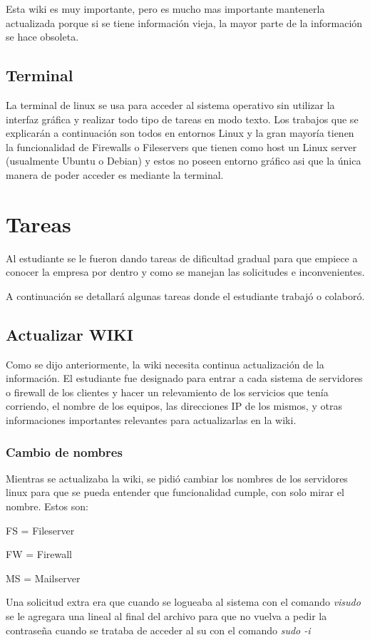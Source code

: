 \documentclass[12pt,a4paper]{article}
\begin{document}
Esta wiki es muy importante, pero es mucho mas importante mantenerla actualizada porque si se tiene información vieja, la mayor parte de la información se hace obsoleta. 

\subsection{Terminal}
La terminal de linux se usa para acceder al sistema operativo sin utilizar la interfaz gráfica y realizar todo tipo de tareas en modo texto. Los trabajos que se explicarán a continuación son todos en entornos Linux y la gran mayoría tienen la funcionalidad de Firewalls o Fileservers que tienen como host un Linux server (usualmente Ubuntu o Debian) y estos no poseen entorno gráfico asi que la única manera de poder acceder es mediante la terminal.

\section{Tareas}
Al estudiante se le fueron dando tareas de dificultad gradual para que empiece a conocer la empresa por dentro y como se manejan las solicitudes e inconvenientes.

A continuación se detallará algunas tareas donde el estudiante trabajó o colaboró.

\subsection{Actualizar WIKI}
Como se dijo anteriormente, la wiki necesita continua actualización de la información. El estudiante fue designado para entrar a cada sistema de servidores o firewall de los clientes y hacer un relevamiento de los servicios que tenía corriendo, el nombre de los equipos, las direcciones IP de los mismos, y otras informaciones importantes relevantes para actualizarlas en la wiki. 

\subsubsection{Cambio de nombres}
Mientras se actualizaba la wiki, se pidió cambiar los nombres de los servidores linux para que se pueda entender que funcionalidad cumple, con solo mirar el nombre. Estos son:

FS = Fileserver

FW = Firewall

MS = Mailserver

Una solicitud extra era que cuando se logueaba al sistema con el comando \textit{visudo} se le agregara una lineal al final del archivo para que no vuelva a pedir la contraseña cuando se trataba de acceder al su con el comando \textit{sudo -i} 
\end{document}
